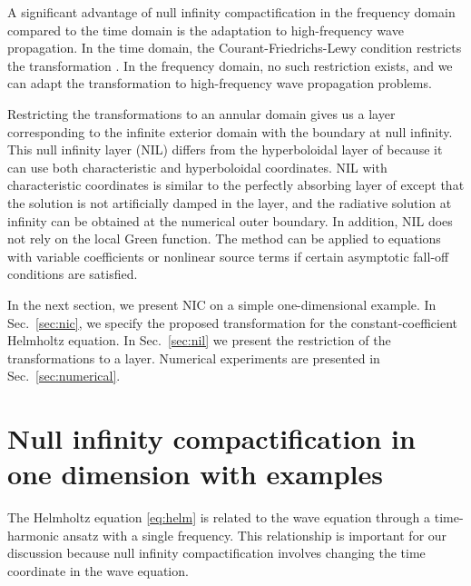 \documentclass[final,onefignum,onetabnum]{siamart190516}
\begin{document}
A significant advantage of null infinity compactification in the frequency domain compared to the time domain is the adaptation to high-frequency wave propagation. In the time domain, the Courant-Friedrichs-Lewy condition restricts the transformation \cite{ZENGINOGLU20112286}. In the frequency domain, no such restriction exists, and we can adapt the transformation to high-frequency wave propagation problems. 

Restricting the transformations to an annular domain gives us a layer corresponding to the infinite exterior domain with the boundary at null infinity. This null infinity layer (NIL) differs from the hyperboloidal layer of \cite{ZENGINOGLU20112286} because it can use both characteristic and hyperboloidal coordinates. NIL with characteristic coordinates is similar to the perfectly absorbing layer of \cite{wang2017perfect, yang2021truly} except that the solution is not artificially damped in the layer, and the radiative solution at infinity can be obtained at the numerical outer boundary. In addition, NIL does not rely on the local Green function. The method can be applied to equations with variable coefficients or nonlinear source terms if certain asymptotic fall-off conditions are satisfied. 

In the next section, we present NIC on a simple one-dimensional example. In Sec.~\ref{sec:nic}, we specify the proposed transformation for the constant-coefficient Helmholtz equation. In Sec.~\ref{sec:nil} we present the restriction of the transformations to a layer. Numerical experiments are presented in Sec.~\ref{sec:numerical}. 

\section{Null infinity compactification in one dimension with examples}\label{sec:simple}
The Helmholtz equation \eqref{eq:helm} is related to the wave equation through a time-harmonic ansatz with a single frequency. This relationship is important for our discussion because null infinity compactification involves changing the time coordinate in the wave equation.
\end{document}
